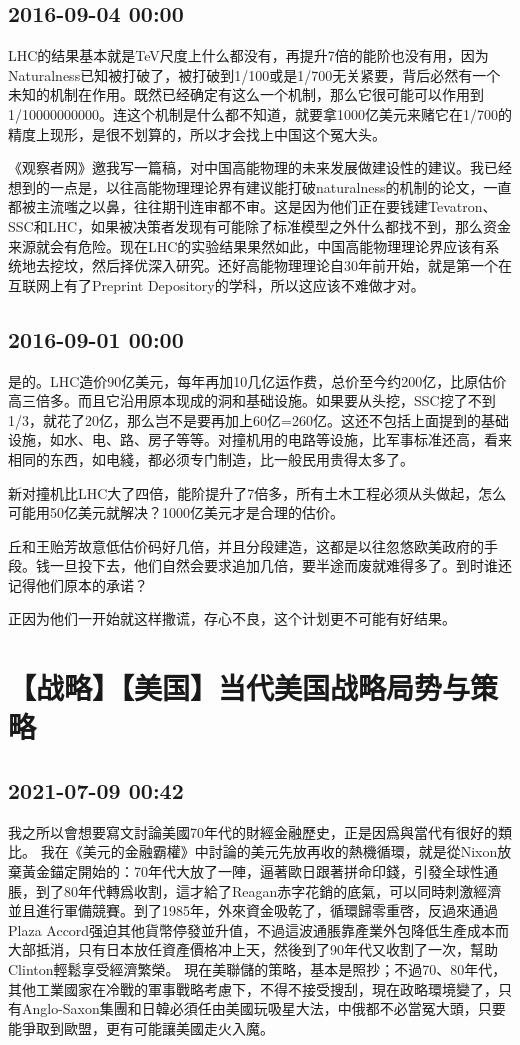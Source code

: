\documentclass[twocolumn]{ctexart}
\begin{document}
\subsection*{2016-09-04 00:00}
LHC的结果基本就是TeV尺度上什么都没有，再提升7倍的能阶也没有用，因为Naturalness已知被打破了，被打破到1/100或是1/700无关紧要，背后必然有一个未知的机制在作用。既然已经确定有这么一个机制，那么它很可能可以作用到1/10000000000。连这个机制是什么都不知道，就要拿1000亿美元来赌它在1/700的精度上现形，是很不划算的，所以才会找上中国这个冤大头。

《观察者网》邀我写一篇稿，对中国高能物理的未来发展做建设性的建议。我已经想到的一点是，以往高能物理理论界有建议能打破naturalness的机制的论文，一直都被主流嗤之以鼻，往往期刊连审都不审。这是因为他们正在要钱建Tevatron、SSC和LHC，如果被决策者发现有可能除了标准模型之外什么都找不到，那么资金来源就会有危险。现在LHC的实验结果果然如此，中国高能物理理论界应该有系统地去挖坟，然后择优深入研究。还好高能物理理论自30年前开始，就是第一个在互联网上有了Preprint Depository的学科，所以这应该不难做才对。\subsection*{2016-09-01 00:00}
是的。LHC造价90亿美元，每年再加10几亿运作费，总价至今约200亿，比原估价高三倍多。而且它沿用原本现成的洞和基础设施。如果要从头挖，SSC挖了不到1/3，就花了20亿，那么岂不是要再加上60亿=260亿。这还不包括上面提到的基础设施，如水、电、路、房子等等。对撞机用的电路等设施，比军事标准还高，看来相同的东西，如电綫，都必须专门制造，比一般民用贵得太多了。

新对撞机比LHC大了四倍，能阶提升了7倍多，所有土木工程必须从头做起，怎么可能用50亿美元就解决？1000亿美元才是合理的估价。

丘和王贻芳故意低估价码好几倍，并且分段建造，这都是以往忽悠欧美政府的手段。钱一旦投下去，他们自然会要求追加几倍，要半途而废就难得多了。到时谁还记得他们原本的承诺？

正因为他们一开始就这样撒谎，存心不良，这个计划更不可能有好结果。\section*{【战略】【美国】当代美国战略局势与策略}
\subsection*{2021-07-09 00:42}

我之所以會想要寫文討論美國70年代的財經金融歷史，正是因爲與當代有很好的類比。
我在《美元的金融霸權》中討論的美元先放再收的熱機循環，就是從Nixon放棄黃金錨定開始的：70年代大放了一陣，逼著歐日跟著拼命印錢，引發全球性通脹，到了80年代轉爲收割，這才給了Reagan赤字花銷的底氣，可以同時刺激經濟並且進行軍備競賽。到了1985年，外來資金吸乾了，循環歸零重啓，反過來通過Plaza Accord强迫其他貨幣停發並升值，不過這波通脹靠產業外包降低生產成本而大部抵消，只有日本放任資產價格冲上天，然後到了90年代又收割了一次，幫助Clinton輕鬆享受經濟繁榮。
現在美聯儲的策略，基本是照抄；不過70、80年代，其他工業國家在冷戰的軍事戰略考慮下，不得不接受搜刮，現在政略環境變了，只有Anglo-Saxon集團和日韓必須任由美國玩吸星大法，中俄都不必當冤大頭，只要能爭取到歐盟，更有可能讓美國走火入魔。
\end{document}
